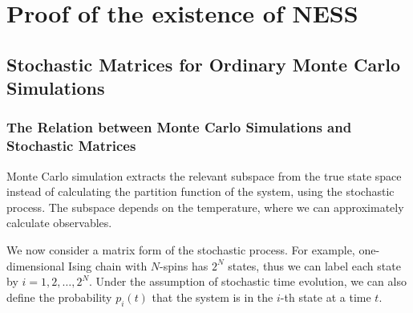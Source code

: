 
\chapter{Proof of the existence of NESS}
\label{chap:ProofEx}

\section{Stochastic Matrices for Ordinary Monte Carlo Simulations}

\subsection{The Relation between Monte Carlo Simulations and Stochastic Matrices}

Monte Carlo simulation extracts the relevant subspace from the true state space instead of calculating the partition function of the system, using the stochastic process. The subspace depends on the temperature, where we can approximately calculate observables.

We now consider a matrix form of the stochastic process. For example, one-dimensional Ising chain with $N$-spins has $2^{N}$ states, thus we can label each state by $i=1,2,\dots,2^{N}$. Under the assumption of stochastic time evolution, we can also define the probability $p_{i}(t)$ that the system is in the $i$-th state at a time $t$.

